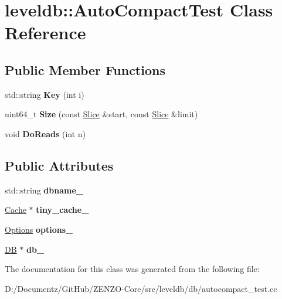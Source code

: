 \hypertarget{classleveldb_1_1_auto_compact_test}{}\section{leveldb\+::Auto\+Compact\+Test Class Reference}
\label{classleveldb_1_1_auto_compact_test}
\subsection*{Public Member Functions}
\begin{DoxyCompactItemize}
\item 
\mbox{\label{classleveldb_1_1_auto_compact_test_a02993bed0b92d580bb0a51b92191eba9}} 
std\+::string {\bfseries Key} (int i)
\item 
\mbox{\label{classleveldb_1_1_auto_compact_test_a4be489ee1b3868f61d9976935e9b2bc4}} 
uint64\+\_\+t {\bfseries Size} (const \mbox{\hyperlink{classleveldb_1_1_slice}{Slice}} \&start, const \mbox{\hyperlink{classleveldb_1_1_slice}{Slice}} \&limit)
\item 
\mbox{\label{classleveldb_1_1_auto_compact_test_a1d1feea1aef1257e461c35eb5b51fa52}} 
void {\bfseries Do\+Reads} (int n)
\end{DoxyCompactItemize}
\subsection*{Public Attributes}
\begin{DoxyCompactItemize}
\item 
\mbox{\label{classleveldb_1_1_auto_compact_test_a9caaa257e508397f94fbe646893b7b3b}} 
std\+::string {\bfseries dbname\+\_\+}
\item 
\mbox{\label{classleveldb_1_1_auto_compact_test_a189cb5733d861b7df8c3bf945180afe5}} 
\mbox{\hyperlink{classleveldb_1_1_cache}{Cache}} $\ast$ {\bfseries tiny\+\_\+cache\+\_\+}
\item 
\mbox{\label{classleveldb_1_1_auto_compact_test_ad7f1f35214065627e4cadd0468d22c21}} 
\mbox{\hyperlink{structleveldb_1_1_options}{Options}} {\bfseries options\+\_\+}
\item 
\mbox{\label{classleveldb_1_1_auto_compact_test_a9e8d5f9bf0546b7d7fdf2128c66d8761}} 
\mbox{\hyperlink{classleveldb_1_1_d_b}{DB}} $\ast$ {\bfseries db\+\_\+}
\end{DoxyCompactItemize}


The documentation for this class was generated from the following file\+:\begin{DoxyCompactItemize}
\item 
D\+:/\+Documentz/\+Git\+Hub/\+Z\+E\+N\+Z\+O-\/\+Core/src/leveldb/db/autocompact\+\_\+test.\+cc\end{DoxyCompactItemize}

